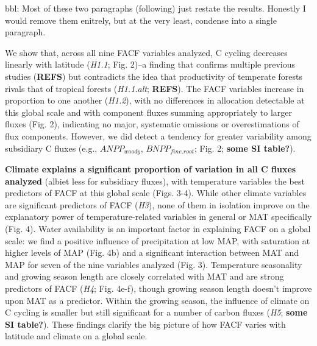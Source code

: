 \documentclass[]{article}
\begin{document}
bbl: Most of these two paragraphs (following) just restate the results.
Honestly I would remove them enitrely, but at the very least, condense
into a single paragraph.

We show that, across all nine FACF variables analyzed, C cycling
decreases linearly with latitude (\emph{H1.1}; Fig. 2)--a finding that
confirms multiple previous studies (\textbf{REFS}) but contradicts the
idea that productivity of temperate forests rivals that of tropical
forests (\emph{H1.1.alt}; \textbf{REFS}). The FACF variables increase in
proportion to one another (\emph{H1.2}), with no differences in
allocation detectable at this global scale and with component fluxes
summing appropriately to larger fluxes (Fig. 2), indicating no major,
systematic omissions or overestimations of flux components. However, we
did detect a tendency for greater variability among subsidiary C fluxes
(e.g., \emph{\(ANPP_{woody}\)}, \emph{\(BNPP_{fine.root}\)}; Fig. 2;
\textbf{some SI table?}).

\textbf{Climate explains a significant proportion of variation in all C
fluxes analyzed} (albiet less for subsidiary fluxes), with temperature
variables the best predictors of FACF at this global scale (Figs. 3-4).
While other climate variables are significant predictors of FACF
(\emph{H3}), none of them in isolation improve on the explanatory power
of temperature-related variables in general or MAT specifically (Fig.
4). Water availability is an important factor in explaining FACF on a
global scale: we find a positive influence of precipitation at low MAP,
with saturation at higher levels of MAP (Fig. 4b) and a significant
interaction between MAT and MAP for seven of the nine variables analyzed
(Fig. 3). Temperature seasonality and growing season length are closely
correlated with MAT and are strong predictors of FACF (\emph{H4}; Fig.
4e-f), though growing season length doesn't improve upon MAT as a
predictor. Within the growing season, the influence of climate on C
cycling is smaller but still significant for a number of carbon fluxes
(\emph{H5}; \textbf{some SI table?}). These findings clarify the big
picture of how FACF varies with latitude and climate on a global scale.
\end{document}
